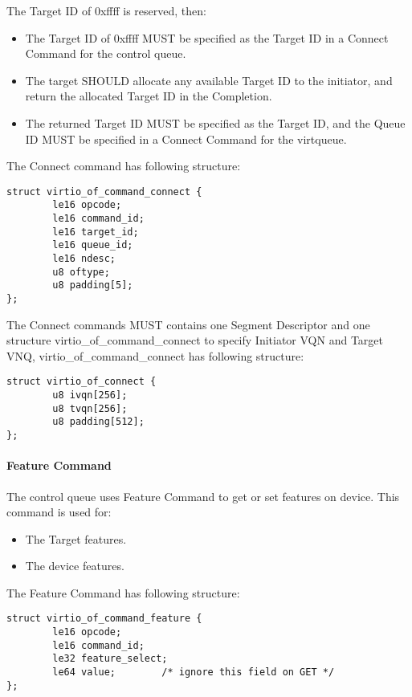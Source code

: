 The Target ID of 0xffff is reserved, then:
\begin{itemize}
\item The Target ID of 0xffff MUST be specified as the Target ID in a Connect Command for the control queue.
\item The target SHOULD allocate any available Target ID to the initiator, and return the allocated Target ID in the Completion.
\item The returned Target ID MUST be specified as the Target ID, and the Queue ID MUST be specified in a Connect Command for the virtqueue.
\end{itemize}

The Connect command has following structure:

\begin{lstlisting}
struct virtio_of_command_connect {
        le16 opcode;
        le16 command_id;
        le16 target_id;
        le16 queue_id;
        le16 ndesc;
        u8 oftype;
        u8 padding[5];
};
\end{lstlisting}

The Connect commands MUST contains one Segment Descriptor and one structure virtio_of_command_connect to specify Initiator VQN and Target VNQ, virtio_of_command_connect has following structure:

\begin{lstlisting}
struct virtio_of_connect {
        u8 ivqn[256];
        u8 tvqn[256];
        u8 padding[512];
};
\end{lstlisting}

\paragraph{Feature Command}\label{sec:Virtio Transport Options / Virtio Over Fabrics / Transmition Protocol / Commands Definition / Feature Command}

The control queue uses Feature Command to get or set features on device. This command is used for:

\begin{itemize}
\item The Target features.
\item The device features.
\end{itemize}

The Feature Command has following structure:

\begin{lstlisting}
struct virtio_of_command_feature {
        le16 opcode;
        le16 command_id;
        le32 feature_select;
        le64 value;        /* ignore this field on GET */
};
\end{lstlisting}

